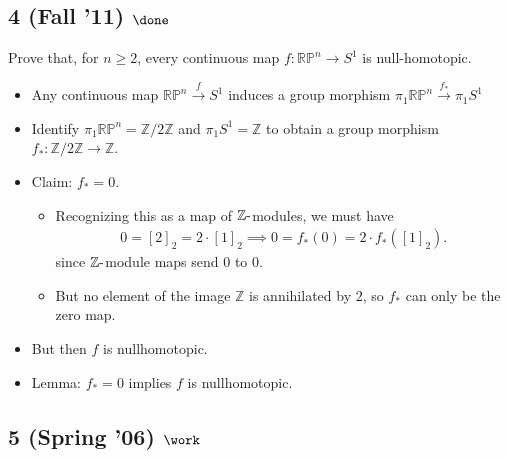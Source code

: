 \hypertarget{fall-11-done}{%
\subsection{\texorpdfstring{4 (Fall '11)
\(\done\)}{4 (Fall '11) \textbackslash done}}\label{fall-11-done}}

Prove that, for \(n \geq 2\), every continuous map
\(f: {\mathbb{RP}}^n \to S^1\) is null-homotopic.

\begin{solution}

\hfill

\begin{concept}

\hfill

\end{concept}

\begin{itemize}
\item
  Any continuous map \({\mathbb{RP}}^n \xrightarrow{f} S^1\) induces a
  group morphism \(\pi_1{\mathbb{RP}}^n \xrightarrow{f_*} \pi_1S^1\)
\item
  Identify \(\pi_1{\mathbb{RP}}^n = {\mathbb{Z}}/2{\mathbb{Z}}\) and
  \(\pi_1S^1 = {\mathbb{Z}}\) to obtain a group morphism
  \(f_*: {\mathbb{Z}}/2{\mathbb{Z}}\to {\mathbb{Z}}\).
\item
  Claim: \(f_* = 0\).

  \begin{itemize}
  \item
    Recognizing this as a map of \({\mathbb{Z}}{\hbox{-}}\)modules, we
    must have
    \begin{align*}  
    0 = [2]_2 = 2\cdot [1]_2  \implies 0 = f_*(0) = 2\cdot f_*([1]_2)
    .\end{align*}
    since \({\mathbb{Z}}{\hbox{-}}\)module maps send 0 to 0.
  \item
    But no element of the image \({\mathbb{Z}}\) is annihilated by
    \(2\), so \(f_*\) can only be the zero map.
  \end{itemize}
\item
  But then \(f\) is nullhomotopic.
\item
  Lemma: \(f_* = 0\) implies \(f\) is nullhomotopic. 
\end{itemize}

\end{solution}

\hypertarget{spring-06-work-6}{%
\subsection{\texorpdfstring{5 (Spring '06)
\(\work\)}{5 (Spring '06) \textbackslash work}}\label{spring-06-work-6}}

